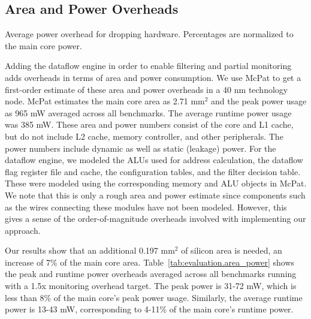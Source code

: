 \subsection{Area and Power Overheads}

\begin{table}[tb]
  \begin{center}
    \vspace{-0.0in}
    \begin{footnotesize}
    
    \end{footnotesize}
    \caption{Average power overhead for dropping hardware. Percentages 
    are normalized to the main core power.}
    \vspace{-0.1in}
    \label{tab:evaluation.area_power}
  \end{center}
\end{table}

Adding the dataflow engine in order to enable filtering and partial monitoring adds
overheads in terms of area and power consumption. We use McPat \cite{mcpat-micro09} to get
a first-order estimate of these area and power overheads in a 40 nm technology
node. McPat estimates the main core area as 2.71 mm$^2$ and the peak power usage as
965 mW averaged across all benchmarks. The average runtime power usage was 385 
mW. These area and power numbers consist of the core and
L1 cache, but do not include L2 cache, memory controller, and other
peripherals. The power numbers include dynamic as well as static (leakage)
power. For the dataflow engine, we modeled the ALUs used for address
calculation, the dataflow flag register file and cache, the configuration
tables, and the filter decision table. These were modeled using the
corresponding memory and ALU objects in McPat. We
note that this is only a rough area and power estimate since components such as the
wires connecting these modules have not been modeled. However, this gives a
sense of the order-of-magnitude overheads involved with implementing our
approach.

Our results show that an additional 0.197 mm$^2$ of silicon area is needed, an
increase of 7\% of the main core area. Table~\ref{tab:evaluation.area_power}
shows the peak and runtime power overheads averaged across all benchmarks running with
a 1.5x monitoring overhead target. The peak power is 31-72 mW, which is
less than 8\% of the main core's peak power usage. Similarly, the average runtime power is 13-43
mW, corresponding to 4-11\% of the main core's runtime power.

